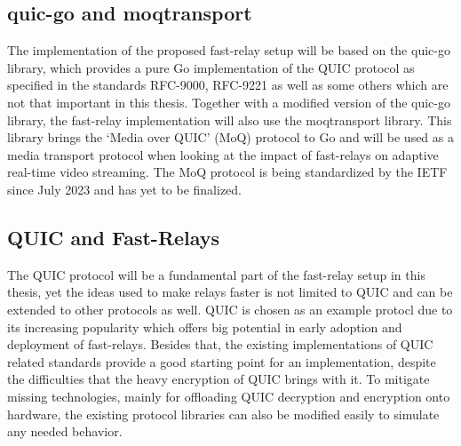 \subsection{quic-go and moqtransport}
The implementation of the proposed fast-relay setup will be based on the quic-go library, which provides a
pure Go implementation of the QUIC protocol as specified in the standards RFC-9000, RFC-9221 as well as some
others which are not that important in this thesis. Together with a modified version of the quic-go library,
the fast-relay implementation will also use the moqtransport library.
This library brings the `Media over QUIC' (MoQ) protocol to Go and will be used as a media transport protocol 
when looking at the impact of fast-relays on adaptive real-time video streaming.
The MoQ protocol is being standardized by the IETF since July 2023 and has yet to be finalized. 

\subsection{QUIC and Fast-Relays}
The QUIC protocol will be a fundamental part of the fast-relay setup in this thesis, yet the ideas used 
to make relays faster is not limited to QUIC and can be extended to other protocols as well.
QUIC is chosen as an example protocl due to its increasing popularity which offers big potential 
in early adoption and deployment of fast-relays.
Besides that, the existing implementations of QUIC related standards provide a good starting point for
an implementation, despite the difficulties that the heavy encryption of QUIC brings with it.
To mitigate missing technologies, mainly for offloading QUIC decryption and encryption onto hardware,
the existing protocol libraries can also be modified easily to simulate any needed behavior.
